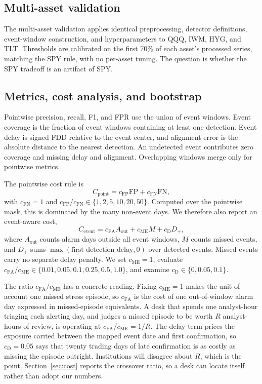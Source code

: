 \documentclass[pdflatex,sn-mathphys-num,iicol]{sn-jnl}
\begin{document}
\subsection{Multi-asset validation}
The multi-asset validation applies identical preprocessing, detector definitions, event-window construction, and hyperparameters to QQQ, IWM, HYG, and TLT. Thresholds are calibrated on the first 70\% of each asset's processed series, matching the SPY rule, with no per-asset tuning. The question is whether the SPY tradeoff is an artifact of SPY.

\subsection{Metrics, cost analysis, and bootstrap}
Pointwise precision, recall, F1, and FPR use the union of event windows. Event coverage is the fraction of event windows containing at least one detection. Event delay is signed FDD relative to the event center, and alignment error is the absolute distance to the nearest detection. An undetected event contributes zero coverage and missing delay and alignment. Overlapping windows merge only for pointwise metrics.

The pointwise cost rule is
\begin{equation}
C_{\mathrm{point}}=c_{\mathrm{FP}}\mathrm{FP}+c_{\mathrm{FN}}\mathrm{FN},
\end{equation}
with $c_{\mathrm{FN}}=1$ and $c_{\mathrm{FP}}/c_{\mathrm{FN}}\in\{1,2,5,10,20,50\}$. Computed over the pointwise mask, this is dominated by the many non-event days. We therefore also report an event-aware cost,
\begin{equation}
\label{eq:eventcost}
C_{\mathrm{event}}=c_{\mathrm{FA}}A_{\mathrm{out}}+c_{\mathrm{ME}}M+c_{\mathrm{D}}D_+,
\end{equation}
where $A_{\mathrm{out}}$ counts alarm days outside all event windows, $M$ counts missed events, and $D_+$ sums $\max(\text{first detection delay},0)$ over detected events. Missed events carry no separate delay penalty. We set $c_{\mathrm{ME}}=1$, evaluate $c_{\mathrm{FA}}/c_{\mathrm{ME}}\in\{0.01,0.05,0.1,0.25,0.5,1.0\}$, and examine $c_{\mathrm{D}}\in\{0,0.05,0.1\}$.

The ratio $c_{\mathrm{FA}}/c_{\mathrm{ME}}$ has a concrete reading. Fixing $c_{\mathrm{ME}}=1$ makes the unit of account one missed stress episode, so $c_{\mathrm{FA}}$ is the cost of one out-of-window alarm day expressed in missed-episode equivalents. A desk that spends one analyst-hour triaging each alerting day, and judges a missed episode to be worth $R$ analyst-hours of review, is operating at $c_{\mathrm{FA}}/c_{\mathrm{ME}}=1/R$. The delay term prices the exposure carried between the mapped event date and first confirmation, so $c_{\mathrm{D}}=0.05$ says that twenty trading days of late confirmation is as costly as missing the episode outright. Institutions will disagree about $R$, which is the point. Section~\ref{sec:cost} reports the crossover ratio, so a desk can locate itself rather than adopt our numbers.
\end{document}
